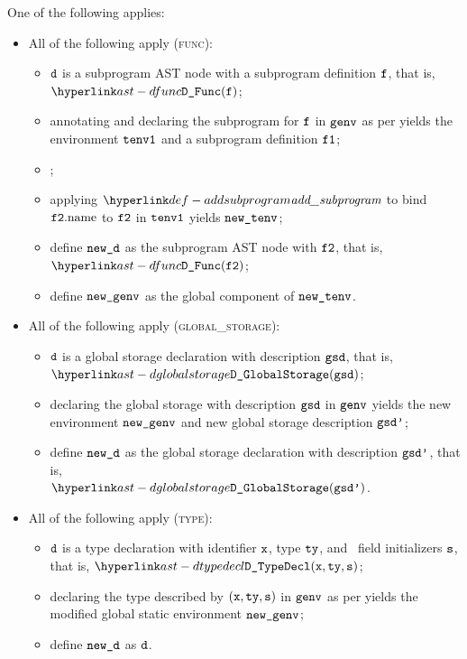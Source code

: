 \ProseParagraph
One of the following applies:
\begin{itemize}
  \item All of the following apply (\textsc{func}):
  \begin{itemize}
    \item $\texttt{d}$ is a subprogram AST node with a subprogram definition $\texttt{f}$, that is, $\DFunc(\vf)$;
    \item annotating and declaring the subprogram for $\texttt{f}$ in $\texttt{genv}$ as per 
          yields the environment $\texttt{tenv1}$ and a subprogram definition $\vfone$\ProseOrTypeError;
    \item \Proseannotatesubprogram{$\vfone$}{$\tenv$}{$\vftwo$\ProseOrTypeError};
    \item applying $\addsubprogram$ to bind $\texttt{f2}.\text{name}$ to $\vftwo$ in $\texttt{tenv1}$ yields $\texttt{new\_tenv}$;
    \item define $\texttt{new\_d}$ as the subprogram AST node with $\vftwo$, that is, $\DFunc(\vftwo)$;
    \item define $\texttt{new\_genv}$ as the global component of $\texttt{new\_tenv}$.
  \end{itemize}

  \item All of the following apply (\textsc{global\_storage}):
  \begin{itemize}
    \item $\texttt{d}$ is a global storage declaration with description $\texttt{gsd}$, that is, \\ $\DGlobalStorage(\gsd)$;
    \item declaring the global storage with description $\texttt{gsd}$ in $\texttt{genv}$ yields the new environment
          $\texttt{new\_genv}$ and new global storage description $\texttt{gsd'}$\ProseOrTypeError;
    \item define $\texttt{new\_d}$ as the global storage declaration with description $\texttt{gsd'}$, that is, \\ $\DGlobalStorage(\gsdp)$.
  \end{itemize}

  \item All of the following apply (\textsc{type}):
  \begin{itemize}
    \item $\texttt{d}$ is a type declaration with identifier $\texttt{x}$, type $\texttt{ty}$,
          and \optional\ field initializers $\texttt{s}$, that is, $\DTypeDecl(\vx, \tty, \vs)$;
    \item declaring the type described by $(\texttt{x}, \texttt{ty}, \texttt{s})$ in $\texttt{genv}$
          as per  yields the modified global static environment $\texttt{new\_genv}$\ProseOrTypeError;
    \item define $\texttt{new\_d}$ as $\texttt{d}$.
  \end{itemize}
\end{itemize}

